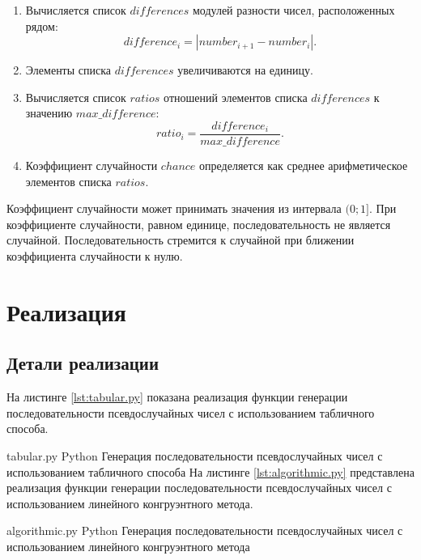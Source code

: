 \begin{enumerate}
	\item Вычисляется список $differences$ модулей разности чисел, расположенных рядом:
		\begin{equation}
			difference_{i} = |number_{i + 1} - number_{i}|.
		\end{equation}
	\item Элементы списка $differences$ увеличиваются на единицу.
	\item Вычисляется список $ratios$ отношений элементов списка $differences$ к значению $max\_difference$:
		\begin{equation}
			ratio_{i} = \frac{difference_{i}}{max\_difference}.
		\end{equation}
	\item Коэффициент случайности $chance$ определяется как среднее арифметическое элементов списка $ratios$.
\end{enumerate}

Коэффициент случайности может принимать значения из интервала $(0;1]$. При коэффициенте случайности, равном единице, последовательность не является случайной. Последовательность стремится к случайной при ближении коэффициента случайности к нулю.

\chapter{Реализация}

\section{Детали реализации}

На листинге \ref{lst:tabular.py} показана реализация функции генерации последовательности псевдослучайных чисел с использованием табличного способа.

    {tabular.py}
    {Python}
    {Генерация последовательности псевдослучайных чисел с использованием табличного способа}
\newpage
На листинге \ref{lst:algorithmic.py} представлена реализация функции генерации последовательности псевдослучайных чисел с использованием линейного конгруэнтного метода.

    {algorithmic.py}
    {Python}
    {Генерация последовательности псевдослучайных чисел с использованием линейного конгруэнтного метода}
    
